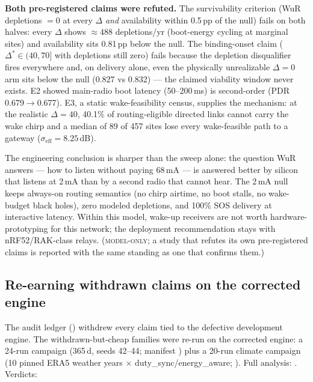 \documentclass[11pt]{article}
\newcommand{\modelonly}{\textsc{model-only}}
\begin{document}
\textbf{Both pre-registered claims were refuted.} The survivability
criterion (WuR depletions $=0$ at every $\Delta$ \emph{and} availability
within 0.5\,pp of the null) fails on both halves: every $\Delta$ shows
${\approx}488$ depletions/yr (boot-energy cycling at marginal sites) and
availability sits 0.81\,pp below the null. The binding-onset claim
($\Delta^{*} \in (40,70]$ with depletions still zero) fails because the
depletion disqualifier fires everywhere and, on delivery alone, even the
physically unrealizable $\Delta{=}0$ arm sits below the null (0.827 vs
0.832) --- the claimed viability window never exists. E2 showed main-radio
boot latency (50--200\,ms) is second-order (PDR 0.679$\to$0.677). E3, a
static wake-feasibility census, supplies the mechanism: at the realistic
$\Delta{=}40$, 40.1\% of routing-eligible directed links cannot carry the
wake chirp and a median of 89 of 457 sites lose every wake-feasible path to
a gateway ($\sigma_{\mathrm{eff}} = 8.25$\,dB).

The engineering conclusion is sharper than the sweep alone: the question
WuR answers --- how to listen without paying 68\,mA --- is answered better
by silicon that listens at 2\,mA than by a second radio that cannot hear.
The 2\,mA null keeps always-on routing semantics (no chirp airtime, no boot
stalls, no wake-budget black holes), zero modeled depletions, and 100\% SOS
delivery at interactive latency. Within this model, wake-up receivers are
not worth hardware-prototyping for this network; the deployment
recommendation stays with nRF52/RAK-class relays. (\modelonly; a study that
refutes its own pre-registered claims is reported with the same standing as
one that confirms them.)

\subsection{Re-earning withdrawn claims on the corrected engine}\label{sec:reearn}

The audit ledger ()
withdrew every claim tied to the defective development engine. The
withdrawn-but-cheap families were re-run on the corrected engine: a 24-run
campaign (365\,d, seeds 42--44; manifest
) plus a 20-run climate campaign
(10 pinned ERA5 weather years $\times$ duty\_sync/energy\_aware;
). Full analysis:
. Verdicts:
\end{document}
